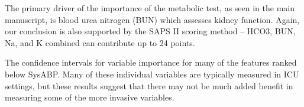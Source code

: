 \documentclass{article}
\begin{document}
The primary driver of the importance of the metabolic test, as seen in the main manuscript, is blood urea nitrogen (BUN) which assesses kidney function.
Again, our conclusion is also supported by the SAPS II scoring method -- HCO3, BUN, Na, and K combined can contribute up to 24 points.

The confidence intervals for variable importance for many of the features ranked below SysABP.
Many of these individual variables are typically measured in ICU settings, but these results suggest that there may not be much added benefit in measuring some of the more invasive variables.




\end{document}

